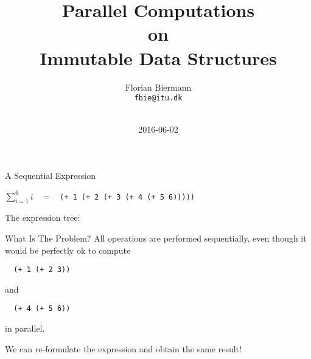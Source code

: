 \documentclass{beamer}
\title{Parallel Computations\\ on\\ Immutable Data Structures}
\author{Florian Biermann \\\small{\texttt{fbie@itu.dk}} \\~}
\institute{IT University of Copenhagen \& UCAS}
\date{2016-06-02}
\begin{document}
\begin{frame}
  \titlepage{}
\end{frame}

\begin{frame}[fragile]{A Sequential Expression}
  \begin{center}
    $\sum_{i=1}^6 i$ ~ = ~ \lstinline{(+ 1 (+ 2 (+ 3 (+ 4 (+ 5 6)))))}
  \end{center}

  \pause{} \vspace{.5cm}

  The expression tree:

  \begin{center}
  \end{center}
\end{frame}

\begin{frame}[fragile]{What Is The Problem?}
All operations are performed sequentially, even though it would be perfectly ok to compute

\begin{lstlisting}
  (+ 1 (+ 2 3))
\end{lstlisting}

and

\begin{lstlisting}
  (+ 4 (+ 5 6))
\end{lstlisting}

in parallel.

\pause{} \vspace{1cm}

We can re-formulate the expression and obtain the same result!
\end{frame}
\end{document}

